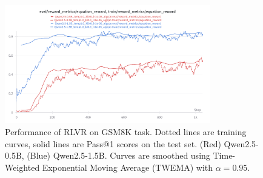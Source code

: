 \documentclass{article} %
\theoremstyle{definition}
\begin{document}
\begin{figure}
    \centering
    \includegraphics[width=0.8\textwidth]{images/GSM8K.png}
    \caption{
        Performance of RLVR on GSM8K task. 
        Dotted lines are training curves, 
        solid lines are Pass@1 scores on the test set.
        (Red) Qwen2.5-0.5B, (Blue) Qwen2.5-1.5B.
        Curves are smoothed using Time-Weighted Exponential Moving Average (TWEMA) with $\alpha = 0.95$.
    }
    \label{fig:gsm8k-results}
\end{figure}
\end{document}
